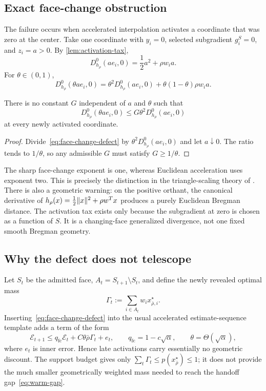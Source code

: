 \subsection{Exact face-change obstruction}

The failure occurs when accelerated interpolation activates a coordinate that
was zero at the center.  Take one coordinate with $y_i=0$, selected
subgradient $g_i^S=0$, and $z_i=a>0$.  By
\cref{lem:activation-tax},
\[
 D_{h_\rho}^{0}(ae_i,0)=\frac12a^2+\rho w_i a.
\]
For $\theta\in(0,1)$,
\begin{equation}
 D_{h_\rho}^{0}(\theta ae_i,0)
 =\theta^2D_{h_\rho}^{0}(ae_i,0)
  +\theta(1-\theta)\rho w_i a.
 \label{eq:face-change-defect}
\end{equation}

\begin{proposition}
\label{prop:no-triangle-scaling}
There is no constant $G$ independent of $a$ and $\theta$ such that
\[
 D_{h_\rho}^{0}(\theta ae_i,0)
 \le G\theta^2D_{h_\rho}^{0}(ae_i,0)
\]
at every newly activated coordinate.
\end{proposition}

\begin{proof}
Divide~\eqref{eq:face-change-defect} by
$\theta^2D_{h_\rho}^{0}(ae_i,0)$ and let $a\downarrow0$.  The ratio tends to
$1/\theta$, so any admissible $G$ must satisfy $G\ge1/\theta$.
\end{proof}

The sharp face-change exponent is one, whereas Euclidean acceleration uses
exponent two.  This is precisely the distinction in the triangle-scaling
theory of \citet{hanzely2021accelerated}.  There is also a geometric warning:
on the positive orthant, the canonical derivative of
$h_\rho(x)=\frac12\lVert x\rVert^2+\rho w^Tx$ produces a purely Euclidean Bregman
distance.  The activation tax exists only because the subgradient at zero is
chosen as a function of $S$.  It is a changing-face generalized divergence,
not one fixed smooth Bregman geometry.

\subsection{Why the defect does not telescope}

Let $S_t$ be the admitted face, $A_t=S_{t+1}\setminus S_t$, and define the
newly revealed optimal mass
\[
 \Gamma_t:=\sum_{i\in A_t}w_i x_{\bar\rho,i}^\star.
\]
Inserting~\eqref{eq:face-change-defect} into the usual accelerated
estimate-sequence template adds a term of the form
\begin{equation}
 \mathcal E_{t+1}
 \le q_{\mathrm{fc}}\mathcal E_t
     +C\theta\bar\rho\Gamma_t+e_t,
 \qquad
 q_{\mathrm{fc}}=1-c\sqrt\alpha,
 \qquad
 \theta=\Theta(\sqrt\alpha),
 \label{eq:defective-estimate-sequence}
\end{equation}
where $e_t$ is inner error.  Hence late activations carry essentially no
geometric discount.  The support budget gives only
$\sum_t\Gamma_t\le p(x_{\bar\rho}^\star)\le1$; it does not provide the much
smaller geometrically weighted mass needed to reach the handoff
gap~\eqref{eq:warm-gap}.

